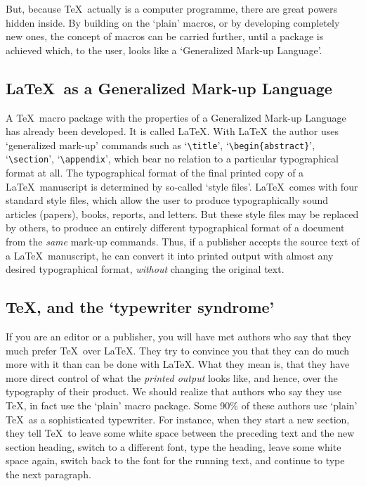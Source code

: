 But, because \TeX\ actually is a computer programme, there are great powers
hidden inside.
By building on the `plain' macros, or by developing completely new ones, the
concept of macros can be carried further, until a package is achieved which,
to the user, looks like a `Generalized Mark-up Language'.

\subsection{\LaTeX\ as a Generalized Mark-up Language}

A \TeX\ macro package with the properties of a Generalized Mark-up Language
has already been developed.
It is called \LaTeX.
With \LaTeX\ the author uses `generalized mark-up' commands such as
`\verb|\title|', `\verb|\begin{abstract}|', `\verb|\section|',
`\verb|\appendix|', which bear no relation to a particular typographical
format at all.
The typographical format of the final printed copy of a \LaTeX\ manuscript
is determined by so-called `style files'.
\LaTeX\ comes with four standard style files, which allow the user to
produce typographically sound articles (papers), books, reports, and letters.
But these style files may be replaced by others, to produce an entirely
different typographical format of a document from the {\sl same\/}
mark-up commands.
Thus, if a publisher accepts the source text of a \LaTeX\ manuscript, he
can convert it into printed output with almost any desired 
typographical format,
{\sl without\/} changing the original text.

\subsection{\TeX, and the `typewriter syndrome'}

If you are an editor or a publisher, you will have met authors who
say that they much prefer \TeX\ over \LaTeX.
They try to convince you that they can do much more with it than can be
done with \LaTeX.
What they mean is, that they have more direct control of what the
{\sl printed output\/} looks like, and hence, over the typography of their
product.
We should realize that authors who say they use \TeX, in fact use the
`plain' macro package.
Some 90\% of these authors use `plain' \TeX\ as a sophisticated typewriter.
For instance, when they start a new section, they tell \TeX\ to leave some
white space between the preceding text and the new section heading,
switch to a different font, type the heading, leave some white space again,
switch back to the font for the running text, and continue to type the
next paragraph.

